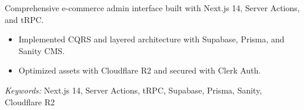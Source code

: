\nointent
{}

\nointent
Comprehensive e-commerce admin interface built with Next.js 14, Server Actions, and tRPC.
\begin{itemize}
    \item Implemented CQRS and layered architecture with Supabase, Prisma, and Sanity CMS.
    \item Optimized assets with Cloudflare R2 and secured with Clerk Auth.
\end{itemize}

\nointent
\textit{Keywords:} Next.js 14, Server Actions, tRPC, Supabase, Prisma, Sanity, Cloudflare R2
